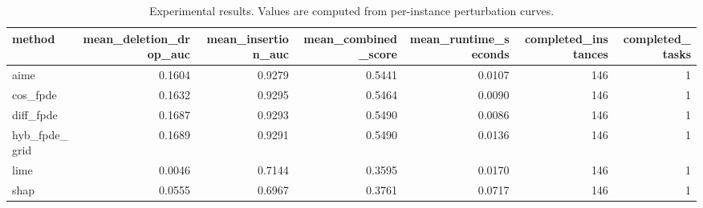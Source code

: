 \begin{table}[t]
\caption{Experimental results. Values are computed from per-instance perturbation curves.}
\label{tab:main_results_computed}
\centering
\begin{tabular}{lrrrrrr}
\toprule
method & mean\_deletion\_drop\_auc & mean\_insertion\_auc & mean\_combined\_score & mean\_runtime\_seconds & completed\_instances & completed\_tasks \\
\midrule
aime & 0.1604 & 0.9279 & 0.5441 & 0.0107 & 146 & 1 \\
cos\_fpde & 0.1632 & 0.9295 & 0.5464 & 0.0090 & 146 & 1 \\
diff\_fpde & 0.1687 & 0.9293 & 0.5490 & 0.0086 & 146 & 1 \\
hyb\_fpde\_grid & 0.1689 & 0.9291 & 0.5490 & 0.0136 & 146 & 1 \\
lime & 0.0046 & 0.7144 & 0.3595 & 0.0170 & 146 & 1 \\
shap & 0.0555 & 0.6967 & 0.3761 & 0.0717 & 146 & 1 \\
\bottomrule
\end{tabular}

\end{table}
